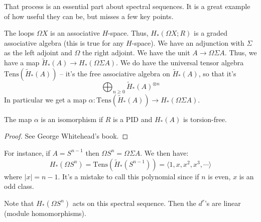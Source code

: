 That process is an essential part about spectral sequences.
It is a great example of how useful they can be, but misses a few key points.
\begin{remark}
    The loops $\Omega X$ is an associative $H$-space.
    Thus, $H_\ast(\Omega X; R)$ is a graded associative algebra (this is true for any $H$-space).
    We have an adjunction with $\Sigma$ as the left adjoint and $\Omega$ the right adjoint.
    We have the unit $A\to \Omega \Sigma A$.
    Thus, we have a map $\widetilde{H}_\ast(A)\to H_\ast(\Omega \Sigma A)$.
    We do have the universal tensor algebra $\mathrm{Tens}(\widetilde{H}_\ast(A))$ -- it's the free associative algebra on $\widetilde{H}_\ast(A)$, so that it's
    $$
    \bigoplus_{n\geq 0}\widetilde{H}_\ast(A)^{\otimes n}
    $$
    In particular we get a map $\alpha:\mathrm{Tens}(\widetilde{H}_\ast(A))\to H_\ast(\Omega \Sigma A)$.
    \begin{theorem}
	The map $\alpha$ is an isomorphism if $R$ is a PID and $H_\ast(A)$ is torsion-free.
    \end{theorem}
    \begin{proof}
	See George Whitehead's book.
    \end{proof}
    For instance, if $A = S^{n-1}$ then $\Omega S^n = \Omega \Sigma A$.
    We then have:
    $$
    H_\ast(\Omega S^n) = \mathrm{Tens}(\widetilde{H}_\ast(S^{n-1})) = \langle 1, x, x^2, x^3, \cdots\rangle
    $$
    where $|x| = n-1$.
    It's a mistake to call this polynomial since if $n$ is even, $x$ is an odd class.
\end{remark}
Note that $H_\ast(\Omega S^n)$ acts on this spectral sequence.
Then the $d^r$'s are linear (module homomorphisms).
